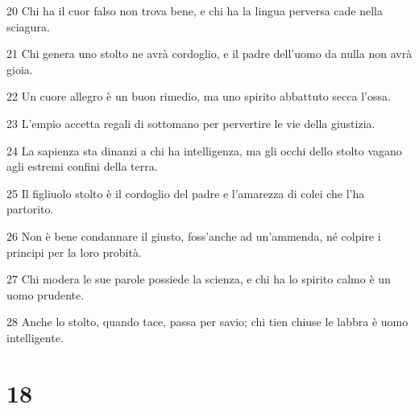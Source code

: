 \par 20 Chi ha il cuor falso non trova bene, e chi ha la lingua perversa cade nella sciagura.
\par 21 Chi genera uno stolto ne avrà cordoglio, e il padre dell'uomo da nulla non avrà gioia.
\par 22 Un cuore allegro è un buon rimedio, ma uno spirito abbattuto secca l'ossa.
\par 23 L'empio accetta regali di sottomano per pervertire le vie della giustizia.
\par 24 La sapienza sta dinanzi a chi ha intelligenza, ma gli occhi dello stolto vagano agli estremi confini della terra.
\par 25 Il figliuolo stolto è il cordoglio del padre e l'amarezza di colei che l'ha partorito.
\par 26 Non è bene condannare il giusto, foss'anche ad un'ammenda, né colpire i principi per la loro probità.
\par 27 Chi modera le sue parole possiede la scienza, e chi ha lo spirito calmo è un uomo prudente.
\par 28 Anche lo stolto, quando tace, passa per savio; chi tien chiuse le labbra è uomo intelligente.

\chapter{18}

